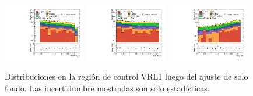 \begin{figure}[ht!]
\begin{center}
    \includegraphics[width=0.32\textwidth]{images_tmp/results/fr2/can_VRL1_dphi_jetmet_afterFit.pdf}
    \includegraphics[width=0.32\textwidth]{images_tmp/results/fr2/can_VRL1_dphi_gammet_afterFit.pdf}
    \includegraphics[width=0.32\textwidth]{images_tmp/results/fr2/can_VRL1_dphi_gamjet_afterFit.pdf}

    \caption{Distribuciones en la región de control VRL1 luego del ajuste de solo fondo. Las incertidumbre mostradas son sólo estadísticas.}
    \label{fig:dist_vrl1_bkgonly}
  \end{center}
\end{figure}

